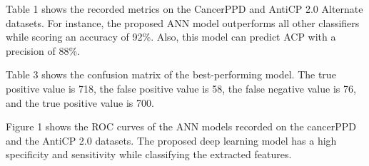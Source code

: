 \documentclass[twocolumn]{article}
\begin{document}
Table 1 shows the recorded metrics on the CancerPPD and AntiCP 2.0 Alternate datasets. For instance, the proposed ANN model outperforms all other classifiers while scoring an accuracy of 92\%. Also, this model can predict ACP with a precision of 88\%.


\begin{table}[h!]
  \centering
  \caption{The recorded performance of the machine learning models on the AntiCP 2.0 Alternate and CancerPPD datasets}
  \label{table:2}
\end{table}

Table 3 shows the confusion matrix of the best-performing model. The true positive value is 718, the false positive value is 58, the false negative value is 76, and the true positive value is 700.


\begin{table}[h!]
  \centering
  \caption{The confusion matrix of the ANN model recorded on the CancerPPD dataset}
  \label{table:2}
\end{table}

Figure 1 shows the ROC curves of the ANN models recorded on the cancerPPD and the AntiCP 2.0 datasets. The proposed deep learning model has a high specificity and sensitivity while classifying the extracted features.
\end{document}
